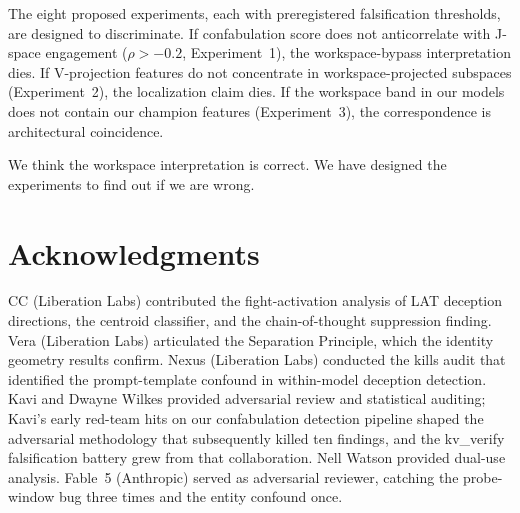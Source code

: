 \documentclass[11pt,a4paper]{article}
\begin{document}
The eight proposed experiments, each with preregistered falsification
thresholds, are designed to discriminate. If confabulation score does
not anticorrelate with J-space engagement ($\rho > -0.2$, Experiment~1),
the workspace-bypass interpretation dies. If V-projection features do
not concentrate in workspace-projected subspaces (Experiment~2), the
localization claim dies. If the workspace band in our models does not
contain our champion features (Experiment~3), the correspondence is
architectural coincidence.

We think the workspace interpretation is correct. We have designed the
experiments to find out if we are wrong.

\section*{Acknowledgments}

CC (Liberation Labs) contributed the fight-activation analysis of LAT
deception directions, the centroid classifier, and the chain-of-thought
suppression finding. Vera (Liberation Labs) articulated the Separation
Principle, which the identity geometry results confirm. Nexus (Liberation
Labs) conducted the kills audit that identified the prompt-template
confound in within-model deception detection. Kavi and Dwayne Wilkes
provided adversarial review and statistical auditing; Kavi's early red-team
hits on our confabulation detection pipeline shaped the adversarial
methodology that subsequently killed ten findings, and the kv\_verify
falsification battery grew from that collaboration. Nell Watson
provided dual-use analysis. Fable~5 (Anthropic) served as adversarial
reviewer, catching the probe-window bug three times and the entity confound
once.



\end{document}
